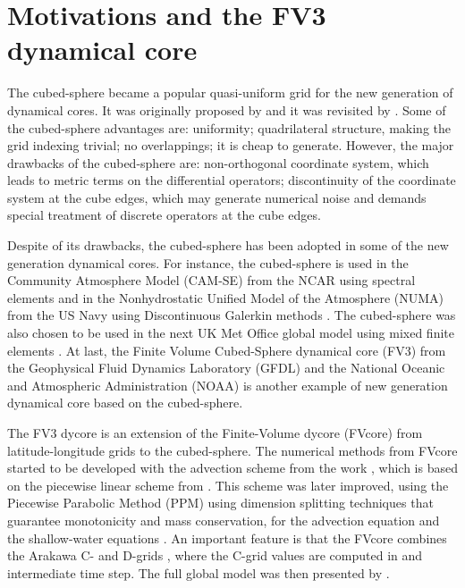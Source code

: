 \section{Motivations and the FV3 dynamical core}
The cubed-sphere became a popular quasi-uniform grid for the new generation of dynamical cores.
It was originally proposed by \citet{sadourny:1972} and it was revisited by \citet{ronchi:1996}.
Some of the cubed-sphere advantages are: uniformity; quadrilateral structure, 
making the grid indexing trivial; no overlappings; it is cheap to generate.
However, the major drawbacks of the cubed-sphere are: non-orthogonal coordinate system, which
leads to metric terms on the differential operators; discontinuity of the coordinate system
at the cube edges, which may generate numerical noise and
demands special treatment of discrete operators at the cube edges.

Despite of its drawbacks, the cubed-sphere has been adopted in some of the new generation
dynamical cores.
For instance, the cubed-sphere is used in the 
Community Atmosphere Model (CAM-SE) from the NCAR using spectral elements \citep{dennis:2012} and in the
Nonhydrostatic Unified Model of the Atmosphere (NUMA) from the US Navy using Discontinuous Galerkin 
methods \citep{giraldo:2013}. The cubed-sphere was also chosen to be used in the next UK Met Office
global model using mixed finite elements \citep{melvin:2022}.
At last, the Finite­ Volume Cubed-Sphere dynamical core (FV3) from the Geophysical Fluid 
Dynamics Laboratory (GFDL) and the National Oceanic and Atmospheric Administration (NOAA)
\citep{putman:2007,harris:2013} is another example
of new generation dynamical core based on the cubed-sphere.

The FV3 dycore is an extension of the Finite-Volume dycore (FVcore)
from latitude-longitude grids to the cubed-sphere.
The numerical methods from FVcore started to be developed with the advection scheme from the work \citet{lin:1994},
which is based on the piecewise linear scheme from \citet{vanleer:1977}. 
This scheme was later improved, using the Piecewise Parabolic Method (PPM) \citep{colella:1984, carpenter:1990}
using dimension splitting techniques that guarantee monotonicity and mass conservation,
for the advection equation \citep{lin:1996} and the shallow-water equations \citep{lin:1997}. 
An important feature is that the FVcore combines the  Arakawa C- and D-grids \citep{arakawa:1977},
where the C-grid values are computed in and intermediate time step. 
The full global model was then presented by \citet{lin:2004}.

